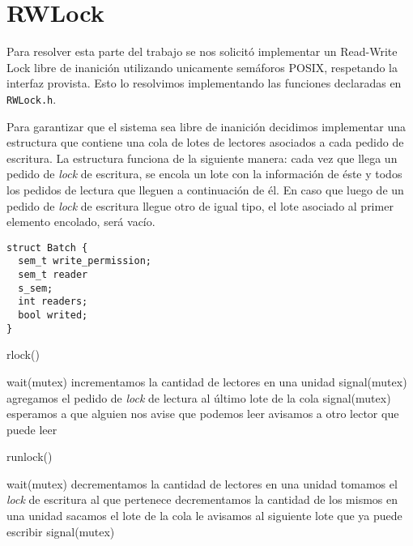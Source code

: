 \section{RWLock}

Para resolver esta parte del trabajo se nos solicitó implementar un Read-Write Lock libre de inanición utilizando
unicamente semáforos POSIX, respetando la interfaz provista. Esto lo resolvimos implementando las funciones declaradas en \verb|RWLock.h|.

	Para garantizar que el sistema sea libre de inanición decidimos implementar una estructura que contiene una cola de lotes de lectores asociados a cada pedido de escritura. 
	La estructura funciona de la siguiente manera: cada vez que llega un pedido de \textit{lock} de escritura, se encola un lote con la información de éste y todos los pedidos de lectura que lleguen a continuación de él. En caso que luego de un pedido de \textit{lock} de escritura llegue otro de igual tipo, el lote asociado al primer  elemento encolado, será vacío.   


\begin{verbatim}
struct Batch {
  sem_t write_permission;
  sem_t reader
  s_sem;
  int readers;
  bool writed;
}
\end{verbatim}
	
\begin{algorithm}[H]
\caption{rlock()}
\begin{algorithmic}[1]
\STATE wait(mutex)
\STATE incrementamos la cantidad de lectores en una unidad
\STATE signal(mutex)
\ELSE
\STATE agregamos el pedido de \textit{lock} de lectura al último lote de la cola
\STATE signal(mutex)
\STATE esperamos a que alguien nos avise que podemos leer 
\STATE avisamos a otro lector que puede leer
\ENDIF
\end{algorithmic}
\end{algorithm}


\begin{algorithm}[H]
\caption{runlock()}
\begin{algorithmic}[1]
\STATE wait(mutex)
\STATE decrementamos la cantidad de lectores en una unidad
	\STATE tomamos el \textit{lock} de escritura al que pertenece
		\STATE decrementamos la cantidad de los mismos en una unidad
	\ENDIF
			\STATE sacamos el lote de la cola
		\ENDIF
			\STATE le avisamos al siguiente lote que ya puede escribir
		\ENDIF
	\ENDIF	 
\ENDIF
\STATE signal(mutex)

\end{algorithmic}
\end{algorithm}

